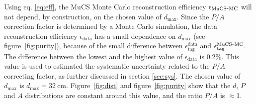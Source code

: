 \documentclass[a4paper,11pt]{article}
\def\myhyphen{{\hbox{-}}}
\begin{document}
Using eq. \eqref{eq:eff}, the MuCS Monte Carlo reconstruction efficiency $\epsilon_{\mathrm{MuCS\myhyphen MC}}$ will not depend, by construction, on the chosen value of $d_{\mathrm{max}}$. Since the $P/A$ correction factor is determined by a Monte Carlo simulation, the data reconstruction efficiency $\epsilon_{\mathrm{data}}$ has a small dependence on $d_{\mathrm{max}}$ (see figure~\ref{fig:purity}), because of the small difference between $\epsilon^{\mathrm{data}}_{\mathrm{tag}}$ and $\epsilon^{\mathrm{MuCS\myhyphen MC}}_{\mathrm{tag}}$.
The difference between the lowest and the highest value of $\epsilon_{\mathrm{data}}$ is $0.2\%$. This value is used to estimated the systematic uncertainty related to the $P/A$ correcting factor, as further discussed in section \ref{sec:sys}.
The chosen value of $d_{\mathrm{max}}$ is $d_{\mathrm{max}}=32~\mathrm{cm}$. Figure~\ref{fig:dist} and figure~\ref{fig:purity} show that the $d$, $P$ and $A$ distributions are constant around this value, and the ratio $P/A$ is $\approx$1.%


\end{document}
